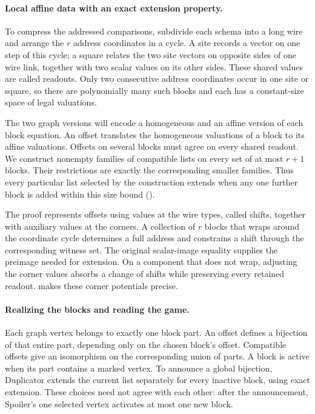 \paragraph{Local affine data with an exact extension property.}
To compress the addressed comparisons, subdivide each schema into a
long wire and arrange the \(r\) address coordinates in a cycle.
A site records a vector on one step of this cycle; a square relates
the two site vectors on opposite sides of one wire link, together
with two scalar values on its other sides. These shared values are
called readouts. Only two consecutive address coordinates occur in
one site or square, so there are polynomially many such blocks and
each has a constant-size space of legal valuations.

The two graph versions will encode a homogeneous and an affine version
of each block equation. An offset translates the homogeneous valuations
of a block to its affine valuations. Offsets on several blocks must
agree on every shared readout. We construct nonempty families of compatible lists on every set of at
most \(r+1\) blocks. Their restrictions are exactly the corresponding
smaller families. Thus every particular list selected by the construction
extends when any one further block is added within this size bound
().

The proof represents offsets using values at the wire types, called
shifts, together with auxiliary values at the corners. A collection of
\(r\) blocks that wraps around the coordinate cycle determines a full
address and constrains a shift through the corresponding witness set.
The original scalar-image equality supplies the preimage needed for
extension. On a component that does not wrap, adjusting the corner
values absorbs a change of shifts while preserving every retained
readout.  makes these corner potentials precise.

\paragraph{Realizing the blocks and reading the game.}
Each graph vertex belongs to exactly one block part. An offset defines
a bijection of that entire part, depending only on the chosen block's
offset. Compatible offsets give an isomorphism on the corresponding
union of parts. A block is active when its part contains a marked vertex.
To announce a global bijection, Duplicator extends the
current list separately for every inactive block, using exact extension.
These choices need not agree with each other: after the announcement,
Spoiler's one selected vertex activates at most one new block.

